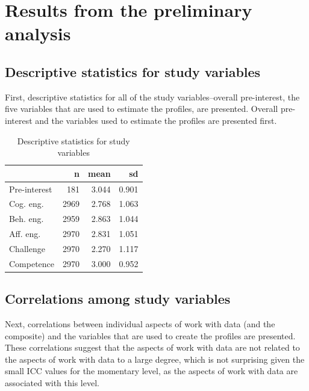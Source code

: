\documentclass[]{msu-thesis}
\theoremstyle{definition}
\theoremstyle{definition}
\theoremstyle{definition}
\theoremstyle{remark}
\begin{document}
\section{Results from the preliminary
analysis}\label{results-from-the-preliminary-analysis}

\subsection{Descriptive statistics for study
variables}\label{descriptive-statistics-for-study-variables}

First, descriptive statistics for all of the study variables--overall
pre-interest, the five variables that are used to estimate the profiles,
are presented. Overall pre-interest and the variables used to estimate
the profiles are presented first.

\begin{table}

\caption{\label{tab:unnamed-chunk-7}Descriptive statistics for study variables}
\centering
\begin{tabular}[t]{lrrr}
\toprule
 & n & mean & sd\\
\midrule
Pre-interest & 181 & 3.044 & 0.901\\
Cog. eng. & 2969 & 2.768 & 1.063\\
Beh. eng. & 2959 & 2.863 & 1.044\\
Aff. eng. & 2970 & 2.831 & 1.051\\
Challenge & 2970 & 2.270 & 1.117\\
Competence & 2970 & 3.000 & 0.952\\
\bottomrule
\end{tabular}
\end{table}

\subsection{Correlations among study
variables}\label{correlations-among-study-variables}

Next, correlations between individual aspects of work with data (and the
composite) and the variables that are used to create the profiles are
presented. These correlations suggest that the aspects of work with data
are not related to the aspects of work with data to a large degree,
which is not surprising given the small ICC values for the momentary
level, as the aspects of work with data are associated with this level.
\end{document}
